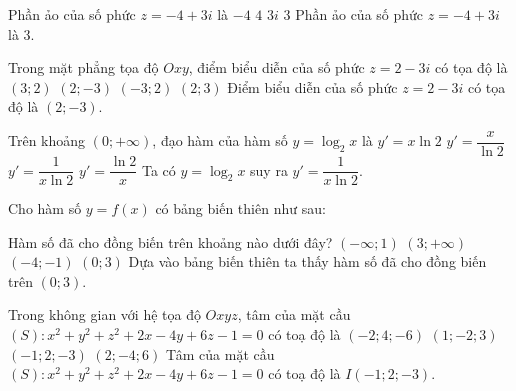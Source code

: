 \begin{ex}%
Phần ảo của số phức $z=-4+3i$ là
\choice
{$-4$}
{$4$}
{$3i$}
{\True $3$}
\loigiai
{Phần ảo của số phức $z=-4+3i$ là $3$.
}
\end{ex}

\begin{ex}%
Trong mặt phẳng tọa độ $Oxy$, điểm biểu diễn của số phức $z=2-3i$ có tọa độ là
\choice
{$(3;2)$}
{\True $(2;-3)$}
{$(-3;2)$}
{$(2;3)$}
\loigiai
{Điểm biểu diễn của số phức $z=2-3i$ có tọa độ là $(2;-3)$.
}
\end{ex}

\begin{ex}%
Trên khoảng $(0;+\infty)$, đạo hàm của hàm số $y=\log_2 x$ là
\choice
{$y'=x\ln 2$}
{$y'=\dfrac{x}{\ln 2}$}
{\True $y'=\dfrac{1}{x\ln 2}$}
{$y'=\dfrac{\ln 2}{x}$}
\loigiai
{Ta có $y=\log_2 x$ suy ra $y'=\dfrac{1}{x\ln 2}$.
}
\end{ex}

\begin{ex}%
Cho hàm số $y=f(x)$ có bảng biến thiên như sau:
\begin{center}
\end{center}
Hàm số đã cho đồng biến trên khoảng nào dưới đây?
\choice
{$(-\infty;1)$}
{$(3;+\infty)$}
{$(-4;-1)$}
{\True $(0;3)$}
\loigiai
{Dựa vào bảng biến thiên ta thấy hàm số đã cho đồng biến trên $(0;3)$.
}
\end{ex}

\begin{ex}%
Trong không gian với hệ tọa độ $O x y z$, tâm của mặt cầu $(S)\colon x^2+y^2+z^2+2 x-4 y+6 z-1=0$ có toạ độ là
\choice
{$(-2 ; 4 ;-6)$}
{$(1 ;-2 ; 3)$}
{\True $(-1 ; 2 ;-3)$}
{$(2 ;-4 ; 6)$}
\loigiai
{
Tâm của mặt cầu $(S)\colon x^2+y^2+z^2+2 x-4 y+6 z-1=0$ có toạ độ là $I(-1;2;-3)$.
}
\end{ex}

